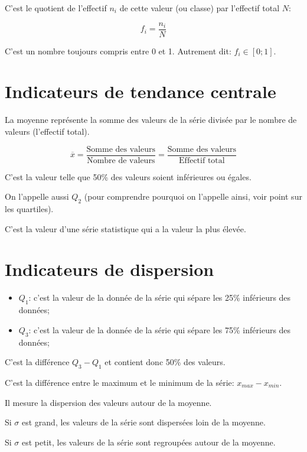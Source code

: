 \documentclass[a4paper,12pt]{scrartcl}
\begin{document}

C'est le quotient de l'effectif $n_i$ de cette valeur (ou classe) par l'effectif total $N$: 

$$f_i = \dfrac{n_i}{N}$$

C'est un nombre toujours compris entre 0 et 1. Autrement dit: $f_i \in [0;1]$.

\section*{Indicateurs de tendance centrale}


La moyenne représente la somme des valeurs de la série divisée par le nombre de valeurs (l'effectif total).

$$\overline{x} = \dfrac{\mbox{Somme des valeurs}}{\mbox{Nombre de valeurs}} = \dfrac{\mbox{Somme des valeurs}}{\mbox{Effectif total}}$$


C'est la valeur telle que 50\% des valeurs soient inférieures ou égales. 

On l'appelle aussi $Q_2$ (pour comprendre pourquoi on l'appelle ainsi, voir point sur les quartiles).


C'est la valeur d'une série statistique qui a la valeur la plus élevée.

\section*{Indicateurs de dispersion}


\begin{itemize}
\item $Q_1$: c'est la valeur de la donnée de la série qui sépare les 25\% inférieurs des données;
\item $Q_3$: c'est la valeur de la donnée de la série qui sépare les 75\% inférieurs des données;
\end{itemize}


C'est la différence $Q_3 - Q_1$ et contient donc 50\% des valeurs.


C'est la différence entre le maximum et le minimum de la série: $x_{max} - x_{min}$.


Il mesure la dispersion des valeurs autour de la moyenne.

Si $\sigma$ est grand, les valeurs de la série sont dispersées loin de la moyenne.

Si $\sigma$ est petit, les valeurs de la série sont regroupées autour de la moyenne.
\end{document}
